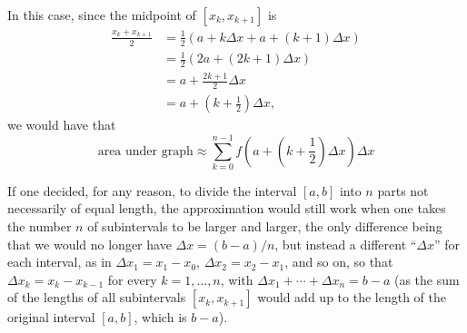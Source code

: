 \documentclass[nooutcomes]{ximera}
\begin{document}
 \begin{image}
\end{image}


In this case, since the midpoint of $[x_k,x_{k+1}]$ is \begin{align*}\frac{x_k+x_{k+1}}{2} &= \frac{1}{2}(a+k \Delta x + a + (k+1)\Delta x) \\ &= \frac{1}{2}(2a+(2k+1)\Delta x) \\ &= a+ \frac{2k+1}{2}\Delta x \\ &= a + \left(k+\frac{1}{2}\right)\Delta x,\end{align*}we would have that $$\mbox{area under graph} \approx \sum_{k=0}^{n-1} f\left(a + \left(k+\frac{1}{2}\right)\Delta x\right) \Delta x$$

If one decided, for any reason, to divide the interval $[a,b]$ into $n$ parts not necessarily of equal length, the approximation would still work when one takes the number $n$ of subintervals to be larger and larger, the only difference being that we would no longer have $\Delta x = (b-a)/n$, but instead a different ``$\Delta x$'' for each interval, as in $\Delta x_1 = x_1-x_0$, $\Delta x_2= x_2-x_1$, and so on, so that $\Delta x_k = x_k-x_{k-1}$ for every $k=1,\ldots, n$, with $\Delta x_1+\cdots + \Delta x_n = b-a$ (as the sum of the lengths of all subintervals $[x_k,x_{k+1}]$ would add up to the length of the original interval $[a,b]$, which is $b-a$).
\end{document}
